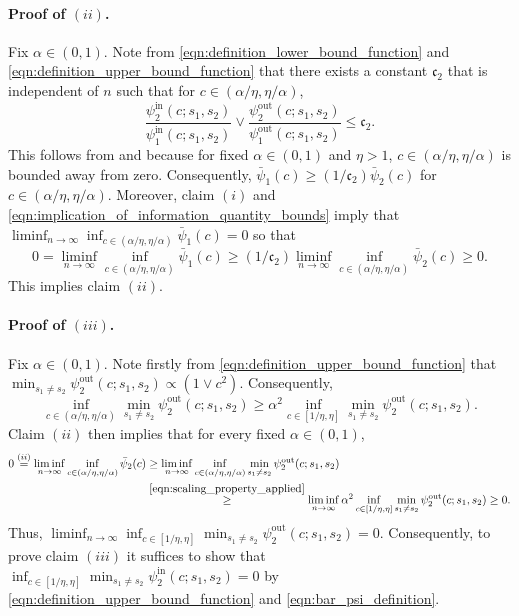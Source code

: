 \documentclass[11pt]{article}
\newcommand{\mf}[1]{\mathfrak{#1}}
\theoremstyle{definition}
\theoremstyle{definition}
\begin{document}
\paragraph*{Proof of $(ii)$.}
Fix $\alpha\in(0,1)$.
Note from \eqref{eqn:definition_lower_bound_function} and \eqref{eqn:definition_upper_bound_function} that there exists a constant $\mf{c}_2$ that is independent of $n$ such that for $c\in (\alpha/\eta,\eta/\alpha)$,
\begin{equation}
	\frac{\psi_2^{\mathrm{in}}(c;s_1,s_2)}{\psi_1^{\mathrm{in}}(c;s_1,s_2)}
	\vee
	\frac{\psi_2^{\mathrm{out}}(c;s_1,s_2)}{\psi_1^{\mathrm{out}}(c;s_1,s_2)}
	\leq
	\mf{c}_2
	.
\end{equation}
This follows from  and because for fixed $\alpha\in(0,1)$ and $\eta> 1$, $c\in (\alpha/\eta,\eta/\alpha)$ is bounded away from zero.
Consequently, $\bar{\psi}_1(c)\geq (1/\mf{c}_2)\bar{\psi}_2(c)$ for $c\in(\alpha/\eta,\eta/\alpha)$.
Moreover, claim $(i)$ and \eqref{eqn:implication_of_information_quantity_bounds} imply that $\liminf_{n\rightarrow\infty}\inf_{c\in (\alpha/\eta,\eta/\alpha)}\bar{\psi}_1(c)=0$ so that
\begin{equation}
	0
	=
	\liminf_{n\rightarrow\infty}\inf_{c\in (\alpha/\eta,\eta/\alpha)}\bar{\psi}_1(c)
	\geq
	(1/\mf{c}_2)\liminf_{n\rightarrow \infty}\inf_{c\in (\alpha/\eta,\eta/\alpha)} \bar{\psi}_2(c)
	\geq
	0
	.
\end{equation}
This implies claim $(ii)$.

\paragraph*{Proof of $(iii)$.}
Fix $\alpha\in(0,1)$.
Note firstly from \eqref{eqn:definition_upper_bound_function} that $\min_{s_1\neq s_2}\psi_2^{\mathrm{out}}(c;s_1,s_2)\propto (1\vee c^2)$.
Consequently,
\begin{equation}
	\label{eqn:scaling_property_applied}
	\inf_{c\in(\alpha/\eta,\eta/\alpha)}\min_{s_1\neq s_2}\psi_2^{\mathrm{out}}(c;s_1,s_2)
	\geq
	\alpha^2\inf_{c\in[1/\eta,\eta]}\min_{s_1\neq s_2}\psi_2^{\mathrm{out}}(c;s_1,s_2)
	.
\end{equation}
Claim $(ii)$ then implies that for every fixed $\alpha\in (0,1)$,
\begin{equation}
	\begin{split}
		0
		\overset{(ii)}{=}
		\liminf_{n\rightarrow \infty}\inf_{c\in (\alpha/\eta,\eta/\alpha)} \bar{\psi}_2(c)
		 &
		\geq
		\liminf_{n\rightarrow\infty}
		\inf_{c\in(\alpha/\eta,\eta/\alpha)}\min_{s_1\neq s_2}\psi_2^{\mathrm{out}}(c;s_1,s_2)
		\\
		 &
		\overset{\eqref{eqn:scaling_property_applied}}{\geq}
		\liminf_{n\rightarrow\infty}
		\alpha^2\inf_{c\in[1/\eta,\eta]}\min_{s_1\neq s_2}\psi_2^{\mathrm{out}}(c;s_1,s_2)
		\geq
		0
		.
	\end{split}
\end{equation}
Thus, $\liminf_{n\rightarrow\infty}\inf_{c\in[1/\eta,\eta]}\min_{s_1\neq s_2}\psi_2^{\mathrm{out}}(c;s_1,s_2) = 0$.
Consequently, to prove claim $(iii)$ it suffices to show that $\inf_{c\in[1/\eta,\eta]}\min_{s_1\neq s_2}\psi_2^{\mathrm{in}}(c;s_1,s_2)=0$ by \eqref{eqn:definition_upper_bound_function} and \eqref{eqn:bar_psi_definition}.
\end{document}
